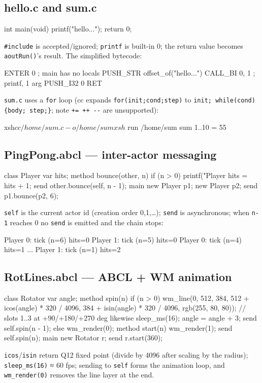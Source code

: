 \documentclass[a4paper,11pt]{article}
\begin{document}
\subsection{hello.c and sum.c}
\begin{code}
int main(void) { printf("hello...\n"); return 0; }
\end{code}
\verb|#include| is accepted/ignored; \verb|printf| is built-in 0; the return
value becomes \verb|aoutRun()|'s result. The simplified bytecode:
\begin{code}
ENTER 0                         ; main has no locals
PUSH_STR offset_of("hello...\n")
CALL_BI 0, 1                    ; printf, 1 arg
PUSH_I32 0
RET
\end{code}
\verb|sum.c| uses a \verb|for| loop (cc expands \verb|for(init;cond;step)| to
\verb|init; while(cond){body; step;}|; note \verb|+= ++ --| are unsupported):
\begin{code}
xsh$ cc /home/sum.c -o /home/sum
xsh$ run /home/sum
sum 1..10 = 55
\end{code}

\subsection{PingPong.abcl --- inter-actor messaging}
\begin{code}
class Player {
    var hits;
    method bounce(other, n) {
        if (n > 0) {
            printf("Player %
            hits = hits + 1;
            send other.bounce(self, n - 1);
        }
    }
}
main { new Player p1; new Player p2; send p1.bounce(p2, 6); }
\end{code}
\verb|self| is the current actor id (creation order 0,1,\dots); \verb|send| is
asynchronous; when \verb|n-1| reaches 0 no \verb|send| is emitted and the chain
stops:
\begin{code}
Player 0: tick (n=6) hits=0
Player 1: tick (n=5) hits=0
Player 0: tick (n=4) hits=1
...
Player 1: tick (n=1) hits=2
\end{code}

\subsection{RotLines.abcl --- ABCL + WM animation}
\begin{code}
class Rotator {
    var angle;
    method spin(n) {
        if (n > 0) {
            wm_line(0, 512, 384,
                    512 + icos(angle) * 320 / 4096,
                    384 + isin(angle) * 320 / 4096, rgb(255, 80, 80));
            // slots 1..3 at +90/+180/+270 deg likewise
            sleep_ms(16);
            angle = angle + 3;
            send self.spin(n - 1);
        } else { wm_render(0); }
    }
    method start(n) { wm_render(1); send self.spin(n); }
}
main { new Rotator r; send r.start(360); }
\end{code}
\verb|icos|/\verb|isin| return Q12 fixed point (divide by 4096 after scaling by
the radius); \verb|sleep_ms(16)| ≈ 60 fps; sending to \verb|self| forms the
animation loop, and \verb|wm_render(0)| removes the line layer at the end.
\end{document}

